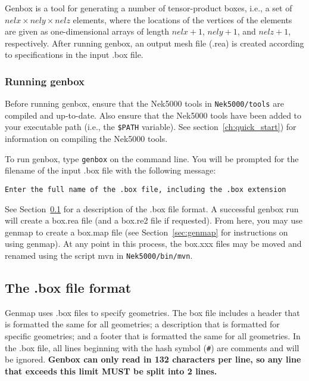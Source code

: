 Genbox is a tool for generating a number of tensor-product boxes, i.e., a set
of \(nelx \times nely \times nelz\) elements, where the locations of the vertices of the
elements are given as one-dimensional arrays of length \(nelx+1\), \(nely+1\), and
\(nelz+1\), respectively.  After running genbox, an output mesh file (.rea) is
created according to specifications in the input .box file.

\subsubsection{Running genbox}

Before running genbox, ensure that the Nek5000 tools in \texttt{Nek5000/tools}
are compiled and up-to-date.  Also ensure that the Nek5000 tools have been
added to your executable path (i.e., the \texttt{\$PATH} variable).  See
section~\ref{ch:quick_start}) for information on compiling the Nek5000 tools.

To run genbox, type \texttt{genbox} on the command line.  You will be prompted
for the filename of the input .box file with the following message:

\begin{verbatim}
Enter the full name of the .box file, including the .box extension
\end{verbatim}

See Section~\ref{sec:box_file} for a description of the .box file format.  A
successful genbox run will create a box.rea file (and a box.re2 file if
requested).  From here, you may use genmap to create a box.map file (see
Section~\ref{sec:genmap} for instructions on using genmap).  At any point in
this process, the box.xxx files may be moved and renamed using the script mvn
in \texttt{Nek5000/bin/mvn}.  

\subsection{The .box file format}\label{sec:box_file}

Genmap uses .box files to specify geometries.  The box file includes a header
that is formatted the same for all geometries; a description that is formatted
for specific geometries; and a footer that is formatted the same for all
geometries.  In the .box file, all lines beginning with the hash symbol
(\texttt{\#}) are comments and will be ignored.  \textbf{Genbox can only read
in 132 characters per line, so any line that exceeds this limit MUST be split
into 2 lines.}

